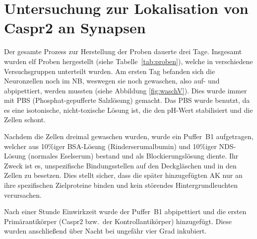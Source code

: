 \documentclass[a4paper, 12pt]{scrreprt}
\begin{document}
\section{Untersuchung zur Lokalisation von Caspr2 an Synapsen}

Der gesamte Prozess zur Herstellung der Proben dauerte drei Tage.
Insgesamt wurden elf Proben hergestellt (siehe Tabelle~\ref{tab:proben}), welche
in verschiedene Versuchsgruppen unterteilt wurden. Am ersten Tag
befanden sich die Neuronzellen noch im NB, weswegen sie noch gewaschen,
also auf- und abpipettiert, werden mussten (siehe Abbildung \ref{fig:waschV}).
Dies wurde immer mit PBS (Phosphat-gepufferte Salzlösung) gemacht. Das
PBS wurde benutzt, da es eine isotonische, nicht-toxische Lösung ist,
die den pH-Wert stabilisiert und die Zellen schont.

Nachdem die Zellen dreimal gewaschen wurden, wurde ein Puffer~B1
aufgetragen, welcher aus 10\%iger BSA-Lösung (Rinderserumalbumin) und
10\%iger NDS-Lösung (normales Eselserum) bestand und als
Blockierungslösung diente. Ihr Zweck ist es, unspezifische
Bindungsstellen auf den Deckgläschen und in den Zellen zu besetzen. Dies
stellt sicher, dass die später hinzugefügten AK nur an ihre spezifischen
Zielproteine binden und kein störendes Hintergrundleuchten verursachen.

Nach einer Stunde Einwirkzeit wurde der Puffer~B1 abpipettiert und die
ersten Primärantikörper (Caspr2 bzw.\ der Kontrollantikörper)
hinzugefügt. Diese wurden anschließend über Nacht bei ungefähr vier Grad
inkubiert.

\end{document}
